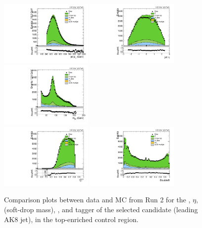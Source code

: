 \begin{figure}[htbp]
  \centering
  \includegraphics[width=0.4\textwidth]{fig/analysis/CR_b1_allL_allP_allC_allE_Run2_lnujj_l2_pt.pdf}
  \includegraphics[width=0.4\textwidth]{fig/analysis/CR_b1_allL_allP_allC_allE_Run2_lnujj_l2_eta.pdf}\\
  \includegraphics[width=0.4\textwidth]{fig/analysis/CR_b1_allL_allP_allC_allE_Run2_mjet.pdf}\\
  \includegraphics[width=0.4\textwidth]{fig/analysis/CR_b1_allL_allP_allC_allE_Run2_tau21DDT.pdf}
  \includegraphics[width=0.4\textwidth]{fig/analysis/CR_b1_allL_allP_allC_allE_Run2_DoubleB.pdf}\\
  \caption{
    Comparison plots between data and MC from Run 2 for the \pt, $\eta$, \MJ (soft-drop mass), \nsubjDDT, and \DoubleB tagger of the selected \Vhad candidate (leading AK8 jet), in the top-enriched control region.
  }
  \label{fig:CR_controlPlotsRun2_3}
\end{figure}

